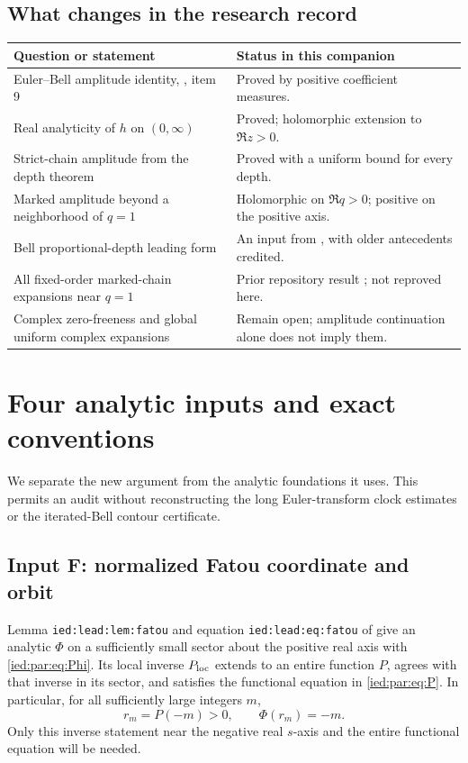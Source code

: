 \documentclass[11pt,letterpaper]{article}
\theoremstyle{remark}\newtheorem{remark}[theorem]{Remark}
\newcommand{\file}[1]{\nolinkurl{#1}}
\begin{document}
\subsection{What changes in the research record}
\begin{center}\small
\begin{tabular}{@{}p{}p{}@{}}
\toprule
Question or statement & Status in this companion\\
\midrule
Euler--Bell amplitude identity, \cite{Euler}, item 9
 & Proved by positive coefficient measures.\\
Real analyticity of $h$ on $(0,\infty)$
 & Proved; holomorphic extension to $\Re z>0$.\\
Strict-chain amplitude from the depth theorem
 & Proved with a uniform bound for every depth.\\
Marked amplitude beyond a neighborhood of $q=1$
 & Holomorphic on $\Re q>0$; positive on the positive axis.\\
Bell proportional-depth leading form
 & An input from \cite{IBD}, with older antecedents credited.\\
All fixed-order marked-chain expansions near $q=1$
 & Prior repository result \cite{Chains}; not reproved here.\\
Complex zero-freeness and global uniform complex expansions
 & Remain open; amplitude continuation alone does not imply them.\\
\bottomrule
\end{tabular}
\end{center}

\section{Four analytic inputs and exact conventions}\label{ied:par:sec:inputs}

We separate the new argument from the analytic foundations it uses.
This permits an audit without reconstructing the long Euler-transform
clock estimates or the iterated-Bell contour certificate.

\subsection*{Input F: normalized Fatou coordinate and orbit}
Lemma \file{ied:lead:lem:fatou} and equation
\file{ied:lead:eq:fatou} of \cite{Euler} give an analytic $\Phi$ on a
sufficiently small sector about the positive real axis with
\eqref{ied:par:eq:Phi}. Its local inverse $P_{\rm loc}$ extends to an entire
function $P$, agrees with that inverse in its sector, and satisfies
the functional equation in \eqref{ied:par:eq:P}. In particular, for all
sufficiently large integers $m$,
\[
 r_m=P(-m)>0,\qquad\Phi(r_m)=-m.
\]
Only this inverse statement near the negative real $s$-axis and the
entire functional equation will be needed.
\end{document}
